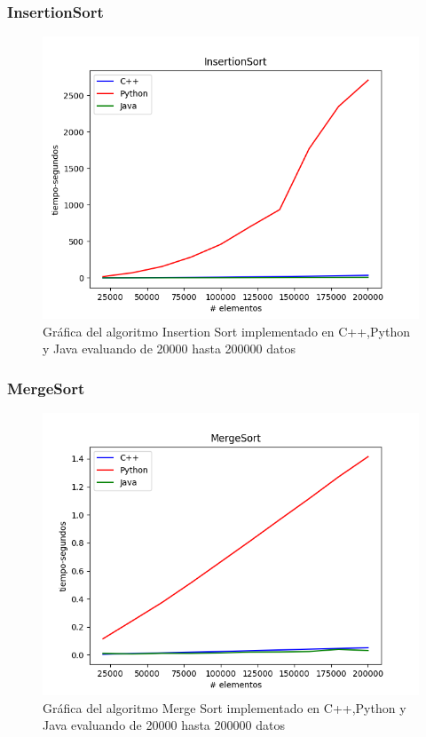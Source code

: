 \subsubsection*{InsertionSort}
\begin{figure}[H]
	   \centering
	   \includegraphics[scale=0.5]{Practica01/images/plots/InsertionSort.png}
	   \caption{Gráfica del algoritmo Insertion Sort implementado en C++,Python y Java evaluando de 20000 hasta 200000 datos}
\end{figure}
\subsubsection*{MergeSort}
\begin{figure}[H]
	   \centering
	   \includegraphics[scale=0.5]{Practica01/images/plots/MergeSort.png}
	   \caption{Gráfica del algoritmo Merge Sort implementado en C++,Python y Java evaluando de 20000 hasta 200000 datos}
\end{figure}
